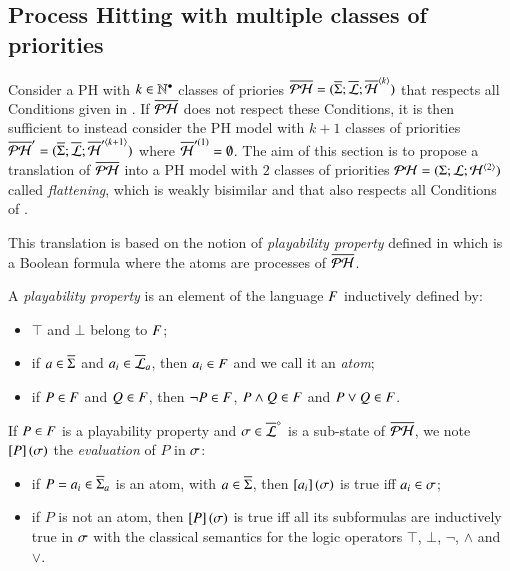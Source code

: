 \subsection{Process Hitting with multiple classes of priorities}
\label{ssec:flattening}

Consider a PH with $k \in \mathbb{N}^\bullet$ classes of priories
$\overline{\mathcal{PH}} = (\overline{\Sigma}; \overline{\mathcal{L}}; \overline{\mathcal{H}}^{{\langle k \rangle}})$
that respects all Conditions given in .
If $\overline{\mathcal{PH}}$ does not respect these Conditions,
it is then sufficient to instead consider the PH model with $k+1$ classes of priorities
$\overline{\mathcal{PH}}' = (\overline{\Sigma}; \overline{\mathcal{L}}; \overline{\mathcal{H}}'^{{\langle k+1 \rangle}})$
where $\overline{\mathcal{H}}'^{(1)} = \emptyset$.
The aim of this section is to propose a translation of $\overline{\mathcal{PH}}$
into a PH model with $2$ classes of priorities $\mathcal{PH} = (\Sigma; \mathcal{L}; \mathcal{H}^{{\langle 2 \rangle}})$
called \emph{flattening},
which is weakly bisimilar
and that also respects all Conditions of .

This translation is based on the notion of \emph{playability property} defined in 
which is a Boolean formula where the atoms are processes of $\overline{\mathcal{PH}}$.

\begin{definition}
  \label{def:pp}
  A \emph{playability property} is an element of the language $F$ inductively defined by:
  \begin{itemize}
    \item $\top$ and $\bot$ belong to $F$;
    \item if $a \in \overline{\Sigma}$ and $a_i \in \overline{\mathcal{L}}_a$, then $a_i \in F$ and we call it an \emph{atom};
    \item if $P \in F$ and $Q \in F$, then $\neg P \in F$, $P \wedge Q \in F$ and $P \vee Q \in F$.
  \end{itemize}
  If $P \in F$ is a playability property and $\sigma \in \overline{\mathcal{L}}^\diamond$ is a sub-state of $\overline{\mathcal{PH}}$,
  we note $\left[P\right](\sigma)$ the \emph{evaluation} of $P$ in $\sigma$:
  \begin{itemize}
    \item if $P = a_i \in \overline{\Sigma}_a$ is an atom, with $a \in \overline{\Sigma}$, then $\left[a_i\right](\sigma)$ is true iff $a_i \in \sigma$;
    \item if $P$ is not an atom, then $\left[P\right](\sigma)$ is true iff all its subformulas are inductively true in $\sigma$
      with the classical semantics for the logic operators $\top$, $\bot$, $\neg$, $\wedge$ and $\vee$.
  \end{itemize}
\end{definition}

